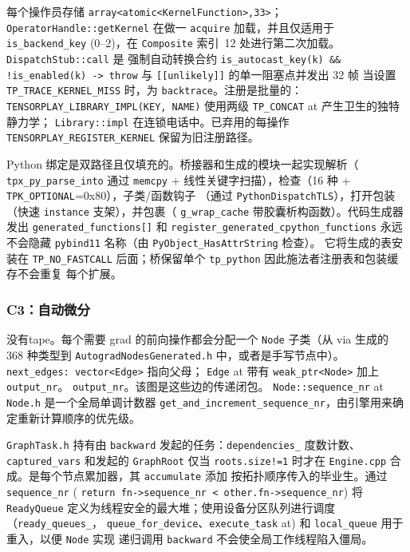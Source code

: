 每个操作员存储 \texttt{array<atomic<KernelFunction>,33>}； \texttt{OperatorHandle::getKernel} 在做一
\texttt{acquire} 加载，并且仅适用于 \texttt{is\_backend\_key} (0--2)，在 \texttt{Composite} 索引~12 处进行第二次加载。 \texttt{DispatchStub::call} 是
强制自动转换合约 \texttt{is\_autocast\_key(k) \&\& !is\_enabled(k) -> throw} 与 \texttt{[[unlikely]]} 的单一阻塞点并发出 32 帧
当设置 \texttt{TP\_TRACE\_KERNEL\_MISS} 时，为 \texttt{backtrace}。注册是批量的：\texttt{TENSORPLAY\_LIBRARY\_IMPL(KEY, NAME)} 使用两级
\texttt{TP\_CONCAT} at 产生卫生的独特静力学； \texttt{Library::impl} 在连锁电话中。已弃用的每操作
\texttt{TENSORPLAY\_REGISTER\_KERNEL} 保留为旧注册路径。

Python 绑定是双路径且仅填充的。桥接器和生成的模块一起实现解析（
\texttt{tpx\_py\_parse\_into} 通过 \texttt{memcpy} + 线性关键字扫描），检查（16 种 + \texttt{TPK\_OPTIONAL}=0x80），子类/函数钩子
（通过 \texttt{PythonDispatchTLS}），打开包装（快速 \texttt{instance} 支架），并包裹（
\texttt{g\_wrap\_cache} 带胶囊析构函数）。代码生成器发出 \texttt{generated\_functions[]} 和
\texttt{register\_generated\_cpython\_functions} 永远不会隐藏 \texttt{pybind11} 名称（由 \texttt{PyObject\_HasAttrString} 检查）。
它将生成的表安装在 \texttt{TP\_NO\_FASTCALL} 后面；桥保留单个 \texttt{tp\_python} 因此施法者注册表和包装缓存不会重复
每个扩展。

\subsubsection{C3：自动微分}
\label{sec:intro:c3}

没有\ac{tape}。每个需要 grad 的前向操作都会分配一个 \texttt{Node} 子类（从 via 生成的 368 种类型到 \texttt{AutogradNodesGenerated.h} 中，或者是手写节点中）。
\texttt{next\_edges: vector<Edge>} 指向父母； \texttt{Edge} at 带有 \texttt{weak\_ptr<Node>} 加上 \texttt{output\_nr}。
\texttt{output\_nr}。该图是这些边的传递闭包。 \texttt{Node::sequence\_nr} at \texttt{Node.h} 是一个全局单调计数器
\texttt{get\_and\_increment\_sequence\_nr}，由引擎用来确定重新计算顺序的优先级。

\texttt{GraphTask.h} 持有由 \texttt{backward} 发起的任务：\texttt{dependencies\_} 度数计数、\texttt{captured\_vars} 和发起的 \texttt{GraphRoot}
仅当 \texttt{roots.size!=1} 时才在 \texttt{Engine.cpp} 合成。是每个节点累加器，其 \texttt{accumulate} 添加
按拓扑顺序传入的毕业生。通过 \texttt{sequence\_nr} ( \texttt{return
fn->sequence\_nr < other.fn->sequence\_nr}) 将 \texttt{ReadyQueue} 定义为线程安全的最大堆；使用设备分区队列进行调度（\texttt{ready\_queues\_}，
\texttt{queue\_for\_device}、\texttt{execute\_task} at) 和 \texttt{local\_queue} 用于重入，以便 \texttt{Node} 实现
递归调用 \texttt{backward} 不会使全局工作线程陷入僵局。

